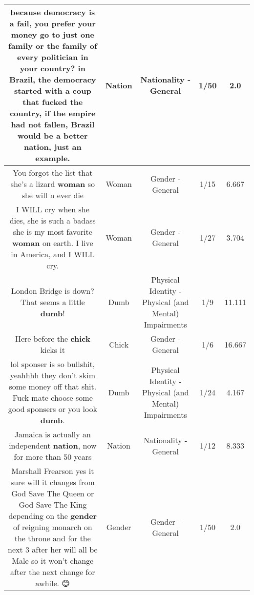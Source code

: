 \documentclass[11pt]{article}
\newlength\mylength
\begin{document}
\begin{center}
\begin{longtable}{|C{.65\mylength}|C{.30\mylength}|C{.12\mylength}|C{.12\mylength}|C{.12\mylength}|}
  \small because democracy is a fail, you prefer your money go to just one family or the family of every politician in your country? in Brazil, the democracy started with a coup that fucked the country, if the empire had not fallen, Brazil would be a better \textbf{nation}, just an example.\normalsize   & Nation & Nationality - General & 1/50 & 2.0 \\  \hline
  \small You forgot the list that she's a lizard \textbf{woman} so she will n ever die\normalsize   & Woman & Gender - General & 1/15 & 6.667 \\  \hline
  \small I WILL cry when she dies, she is such a badass she is my most favorite \textbf{woman} on earth. I live in America, and I WILL cry.\normalsize   & Woman & Gender - General & 1/27 & 3.704 \\  \hline
  \small London Bridge is down? That seems a little \textbf{dumb}!\normalsize   & Dumb & Physical Identity - Physical (and Mental) Impairments & 1/9 & 11.111 \\  \hline
  \small Here before the \textbf{chick} kicks it\normalsize   & Chick & Gender - General & 1/6 & 16.667 \\  \hline
  \small lol sponser is so bullshit, yeahhhh they don't skim some money off that shit. Fuck mate choose some good sponsers or you look \textbf{dumb}.\normalsize   & Dumb & Physical Identity - Physical (and Mental) Impairments & 1/24 & 4.167 \\  \hline
  \small Jamaica is actually an independent \textbf{nation}, now for more than 50 years\normalsize   & Nation & Nationality - General & 1/12 & 8.333 \\  \hline
  \small Marshall Frearson yes it sure will it changes from God Save The Queen or God Save The King depending on the \textbf{gender} of reigning monarch on the throne and for the next 3 after her will all be Male so it won't change after the next change for awhile. 😊\normalsize   & Gender & Gender - General & 1/50 & 2.0 \\  \hline

\end{longtable}
\end{center}
\end{document}
